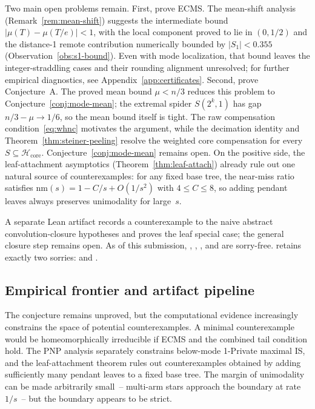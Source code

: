 \documentclass[12pt,oneside]{article}
\theoremstyle{remark}
\newcommand{\nm}{\mathrm{nm}}             %
\begin{document}
Two main open problems remain.
First, prove ECMS.
The mean-shift analysis (Remark~\ref{rem:mean-shift}) suggests the intermediate bound $|\mu(T) - \mu(T/e)| < 1$, with the local component proved to lie in $(0, 1/2)$ and the distance-1 remote contribution numerically bounded by $|S_1| < 0.355$ (Observation~\ref{obs:s1-bound}).
Even with mode localization, that bound leaves the integer-straddling cases and their rounding alignment unresolved; for further empirical diagnostics, see Appendix~\ref{app:certificates}.
Second, prove Conjecture~A.
The proved mean bound $\mu < n/3$ reduces this problem to Conjecture~\ref{conj:mode-mean}; the extremal spider $S(2^k, 1)$ has gap $n/3 - \mu \to 1/6$, so the mean bound itself is tight.
The raw compensation condition~\eqref{eq:whnc} motivates the argument, while the decimation identity and Theorem~\ref{thm:steiner-peeling} resolve the weighted core compensation for every $S\subseteq\mathcal H_{\mathrm{core}}$.
Conjecture~\ref{conj:mode-mean} remains open.
On the positive side, the leaf-attachment asymptotics (Theorem~\ref{thm:leaf-attach}) already rule out one natural source of counterexamples: for any fixed base tree, the near-miss ratio satisfies $\nm(s) = 1 - C/s + O(1/s^2)$ with $4\le C\le8$, so adding pendant leaves always preserves unimodality for large~$s$.

A separate Lean artifact records a counterexample to the naive abstract convolution-closure hypotheses and proves the leaf special case; the general closure step remains open.
As of this submission, , , , and  are sorry-free.
 retains exactly two sorries:  and .

\subsection{Empirical frontier and artifact pipeline}

The conjecture remains unproved, but the computational evidence increasingly constrains the space of potential counterexamples.
A minimal counterexample would be homeomorphically irreducible if ECMS and the combined tail condition hold.
The PNP analysis separately constrains below-mode 1-Private maximal IS, and the leaf-attachment theorem rules out counterexamples obtained by adding sufficiently many pendant leaves to a fixed base tree.
The margin of unimodality can be made arbitrarily small~-- multi-arm stars approach the boundary at rate $1/s$~-- but the boundary appears to be strict.
\end{document}
